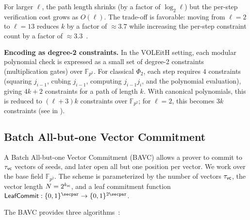 \documentclass[11pt,a4paper]{article}
\theoremstyle{definition}
\theoremstyle{remark}
\newcommand{\F}{\mathbb{F}}
\newcommand{\polyrel}{\Phi}
\begin{document}
For larger $\ell$, the path length shrinks (by a factor of $\log_2 \ell$)
but the per-step verification cost grows as $O(\ell)$. The trade-off is
favorable: moving from $\ell = 2$ to $\ell = 13$ reduces $k$ by a factor
of $\approx 3.7$ while increasing the per-step constraint count by a factor
of $\approx 3.3$~\cite{canonicalModPoly}.

\medskip\noindent
\textbf{Encoding as degree-2 constraints.}
In the VOLEitH setting, each modular polynomial check is expressed as a
small set of degree-2 constraints (multiplication gates) over $\F_{p^2}$.
For classical $\polyrel_2$, each step requires $4$ constraints (squaring
$j_{i-1}$, cubing $j_{i-1}$, computing $j_{i-1} j_i$, and the polynomial
evaluation), giving $4k+2$ constraints for a path of length $k$.
With canonical polynomials, this is reduced to $(\ell+3)k$ constraints
over $\F_{p^2}$; for $\ell = 2$, this becomes $3k$ constraints
(see  in ).

\subsection{Batch All-but-one Vector Commitment}

A Batch All-but-one Vector Commitment (BAVC) allows a prover to commit
to $\tau_{\sf vc}$ vectors of seeds, and later open all but one position per vector.
We work over the base field $\F_{p^2}$.
The scheme is parameterized by the number of vectors $\tau_{\sf vc}$, the vector
length $N = 2^{k_{\sf vc}}$, and a leaf commitment function
$\mathsf{LeafCommit}: \{0,1\}^{\secpar} \to \{0,1\}^{2\secpar}$.

The BAVC provides three algorithms~\cite{faestv2}:
\end{document}
